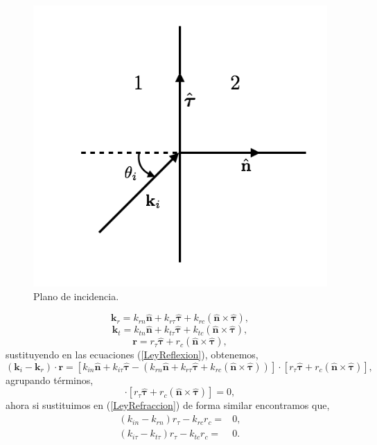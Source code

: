 \documentclass[11pt,fleqn]{book} %
\begin{document}
\begin{figure}[hbtp]
\centering
\includegraphics[scale=0.4]{Pictures/Plano_incidencia.png}
\caption{Plano de incidencia.}
\end{figure}


\begin{equation}
\textbf{k}_r=k_{rn}\hat{\textbf{n}}+k_{r\tau}\hat{\mathbf{\tau}}+k_{rc}(\hat{\textbf{n}}\times\hat{\mathbf{\tau}}),  \label{kr}
\end{equation}
\begin{equation}
\textbf{k}_t=k_{tn}\hat{\textbf{n}}+k_{t\tau}\hat{\mathbf{\tau}}+k_{tc}(\hat{\textbf{n}}\times\hat{\mathbf{\tau}}),  \label{kt}
\end{equation}
\begin{equation}
\textbf{r}=r_{\tau}\hat{\mathbf{\tau}}+r_c(\hat{\textbf{n}}\times\hat{\mathbf{\tau}}),
\end{equation}
sustituyendo en las ecuaciones (\ref{LeyReflexion}), obtenemos,
\begin{equation*}
(\textbf{k}_i-\textbf{k}_r)\cdot\textbf{r}=[k_{in}\hat{\textbf{n}}+k_{i\tau}\hat{\mathbf{\tau}}-(k_{rn}\hat{\textbf{n}}+k_{r\tau}\hat{\mathbf{\tau}}+k_{rc}(\hat{\textbf{n}}\times\hat{\mathbf{\tau}}))]\cdot[r_{\tau}\hat{\mathbf{\tau}}+r_c(\hat{\textbf{n}}\times\hat{\mathbf{\tau}})],
\end{equation*}
agrupando t\'erminos,
\begin{equation*}
[(k_{in}-k_{rn})\hat{\textbf{n}}+(k_{i\tau}-k_{r\tau})\hat{\mathbf{\tau}}-k_{rc}(\hat{\textbf{n}}\times\hat{\mathbf{\tau}})]\cdot[r_{\tau}\hat{\mathbf{\tau}}+r_c(\hat{\textbf{n}}\times\hat{\mathbf{\tau}})]=0,
\end{equation*}
ahora si sustituimos en (\ref{LeyRefraccion}) de forma similar encontramos que,
 \begin{equation}
 \begin{split}
(k_{in}-k_{rn})r_{\tau}-k_{rc}r_{c}=&0,\\
(k_{i\tau}-k_{t\tau})r_{\tau}-k_{tc}r_{c}=&0. \label{Leyes2}
\end{split}
 \end{equation}
\end{document}

